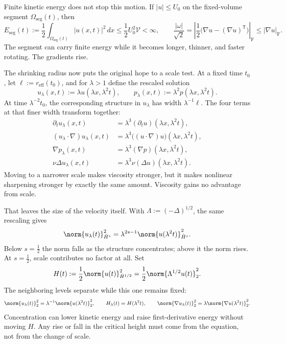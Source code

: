 Finite kinetic energy does not stop this motion.
If \(|u|\leq U_0\) on the fixed-volume segment \(\Omega_{\mathrm{seg}}(t)\), then
\[
  E_{\mathrm{seg}}(t)
  :=
  \frac12\int_{\Omega_{\mathrm{seg}}(t)}|u(x,t)|^2\,dx
  \leq
  \frac12U_0^2\mathcal V
  <
  \infty,
  \qquad
  \frac{|\omega|}{\sqrt2}
  =
  \left|\frac12\bigl(\nabla u-(\nabla u)^{\mathsf T}\bigr)\right|_{\mathrm F}
  \leq
  |\nabla u|_{\mathrm F}.
\]
The segment can carry finite energy while it becomes longer, thinner, and faster rotating.
The gradients rise.


The shrinking radius now puts the original hope to a scale test.
At a fixed time \(t_0\), let \(\ell:=r_{\mathrm{eff}}(t_0)\), and for \(\lambda>1\) define the rescaled solution
\[
  u_\lambda(x,t)
  :=
  \lambda u(\lambda x,\lambda^2t),
  \qquad
  p_\lambda(x,t)
  :=
  \lambda^2p(\lambda x,\lambda^2t).
\]
At time \(\lambda^{-2}t_0\), the corresponding structure in \(u_\lambda\) has width \(\lambda^{-1}\ell\).
The four terms at that finer width transform together:
\[
\begin{aligned}
  \partial_tu_\lambda(x,t)
  &=
  \lambda^3(\partial_tu)(\lambda x,\lambda^2t),
  \\
  (u_\lambda\cdot\nabla)u_\lambda(x,t)
  &=
  \lambda^3\bigl((u\cdot\nabla)u\bigr)(\lambda x,\lambda^2t),
  \\
  \nabla p_\lambda(x,t)
  &=
  \lambda^3(\nabla p)(\lambda x,\lambda^2t),
  \\
  \nu\Delta u_\lambda(x,t)
  &=
  \lambda^3\nu(\Delta u)(\lambda x,\lambda^2t).
\end{aligned}
\]
Moving to a narrower scale makes viscosity stronger, but it makes nonlinear sharpening stronger by exactly the same amount.
Viscosity gains no advantage from scale.


That leaves the size of the velocity itself.
With \(\Lambda:=(-\Delta)^{1/2}\), the same rescaling gives
\[
  \norm{u_\lambda(t)}_{\dot H^s}^2
  =
  \lambda^{2s-1}
  \norm{u(\lambda^2t)}_{\dot H^s}^2.
\]
Below \(s=\tfrac12\) the norm falls as the structure concentrates; above it the norm rises.
At \(s=\tfrac12\), scale contributes no factor at all.
Set
\[
  H(t)
  :=
  \frac12\norm{u(t)}_{\dot H^{1/2}}^2
  =
  \frac12\norm{\Lambda^{1/2}u(t)}_2^2.
\]
The neighboring levels separate while this one remains fixed:
\[
  \norm{u_\lambda(t)}_2^2
  =
  \lambda^{-1}\norm{u(\lambda^2t)}_2^2,
  \qquad
  H_\lambda(t)=H(\lambda^2t),
  \qquad
  \norm{\nabla u_\lambda(t)}_2^2
  =
  \lambda\norm{\nabla u(\lambda^2t)}_2^2.
\]
Concentration can lower kinetic energy and raise first-derivative energy without moving \(H\).
Any rise or fall in the critical height must come from the equation, not from the change of scale.

